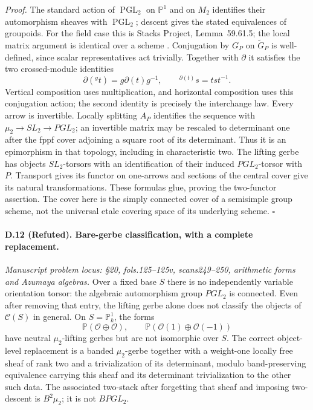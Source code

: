 \emph{Proof.} The standard action of $\operatorname{PGL}_2$ on $\mathbb P^1$ and on $M_2$ identifies their automorphism sheaves with $\operatorname{PGL}_2$; descent gives the stated equivalences of groupoids. For the field case this is Stacks Project, Lemma~59.61.5; the local matrix argument is identical over a scheme \cite{StacksBrauer}. Conjugation by $G_P$ on $\widetilde G_P$ is well-defined, since scalar representatives act trivially. Together with $\partial$ it satisfies the two crossed-module identities
\[
\partial({}^{g}t)=g\partial(t)g^{-1},\qquad
{}^{\partial(t)}s=tst^{-1}.
\]
Vertical composition uses multiplication, and horizontal composition uses this conjugation action; the second identity is precisely the interchange law. Every arrow is invertible. Locally splitting $A_P$ identifies the sequence with $\mu_2\to SL_2\to PGL_2$; an invertible matrix may be rescaled to determinant one after the fppf cover adjoining a square root of its determinant. Thus it is an epimorphism in that topology, including in characteristic two. The lifting gerbe has objects $SL_2$-torsors with an identification of their induced $PGL_2$-torsor with $P$. Transport gives its functor on one-arrows and sections of the central cover give its natural transformations. These formulas glue, proving the two-functor assertion. The cover here is the simply connected cover of a semisimple group scheme, not the universal etale covering space of its underlying scheme. \hfill$\square$

\paragraph{D.12 (Refuted). Bare-gerbe classification, with a complete replacement.}
\emph{Manuscript problem locus: \S20, fols.125--125v, scans249--250, arithmetic forms and Azumaya algebras.}
Over a fixed base $S$ there is no independently variable orientation torsor: the algebraic automorphism group $PGL_2$ is connected. Even after removing that entry, the lifting gerbe alone does not classify the objects of $\mathcal C(S)$ in general. On $S=\mathbb P^1_k$, the forms
\[
\mathbb P(\mathcal O\oplus\mathcal O),\qquad
\mathbb P(\mathcal O(1)\oplus\mathcal O(-1))
\]
have neutral $\mu_2$-lifting gerbes but are not isomorphic over $S$. The correct object-level replacement is a banded $\mu_2$-gerbe together with a weight-one locally free sheaf of rank two and a trivialization of its determinant, modulo band-preserving equivalence carrying this sheaf and its determinant trivialization to the other such data. The associated two-stack after forgetting that sheaf and imposing two-descent is $B^2\mu_2$; it is not $BPGL_2$.

